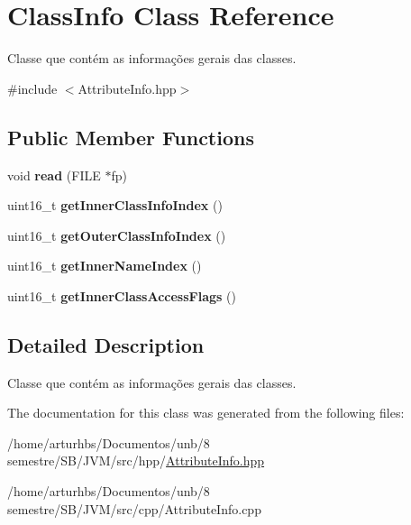 \hypertarget{classClassInfo}{}\section{Class\+Info Class Reference}
\label{classClassInfo}


Classe que contém as informações gerais das classes.  




{\ttfamily \#include $<$Attribute\+Info.\+hpp$>$}

\subsection*{Public Member Functions}
\begin{DoxyCompactItemize}
\item 
void {\bfseries read} (F\+I\+LE $\ast$fp)\hypertarget{classClassInfo_ad2e55dfb641367a6f07cbc9a5fee931b}{}\label{classClassInfo_ad2e55dfb641367a6f07cbc9a5fee931b}

\item 
uint16\+\_\+t {\bfseries get\+Inner\+Class\+Info\+Index} ()\hypertarget{classClassInfo_a6355f698a36e546ab8a83aebdd02deaa}{}\label{classClassInfo_a6355f698a36e546ab8a83aebdd02deaa}

\item 
uint16\+\_\+t {\bfseries get\+Outer\+Class\+Info\+Index} ()\hypertarget{classClassInfo_a89d3d35fe30b9846ff6907be50e86b29}{}\label{classClassInfo_a89d3d35fe30b9846ff6907be50e86b29}

\item 
uint16\+\_\+t {\bfseries get\+Inner\+Name\+Index} ()\hypertarget{classClassInfo_a38075d61d6812ecf422de434aa11bb01}{}\label{classClassInfo_a38075d61d6812ecf422de434aa11bb01}

\item 
uint16\+\_\+t {\bfseries get\+Inner\+Class\+Access\+Flags} ()\hypertarget{classClassInfo_a3e09735f9005ba692b86fbde0417b17f}{}\label{classClassInfo_a3e09735f9005ba692b86fbde0417b17f}

\end{DoxyCompactItemize}


\subsection{Detailed Description}
Classe que contém as informações gerais das classes. 

The documentation for this class was generated from the following files\+:\begin{DoxyCompactItemize}
\item 
/home/arturhbs/\+Documentos/unb/8 semestre/\+S\+B/\+J\+V\+M/src/hpp/\hyperlink{AttributeInfo_8hpp}{Attribute\+Info.\+hpp}\item 
/home/arturhbs/\+Documentos/unb/8 semestre/\+S\+B/\+J\+V\+M/src/cpp/Attribute\+Info.\+cpp\end{DoxyCompactItemize}
